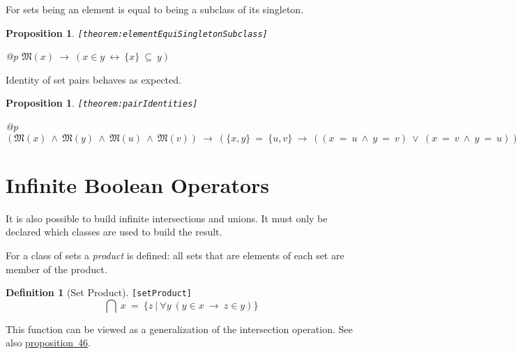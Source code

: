 \documentclass[a4paper,german,10pt,twoside]{book}
\newtheorem{prop}[thm]{Proposition}
\theoremstyle{definition}
\newtheorem{defn}{Definition}
\theoremstyle{remark}
\begin{document}
\par
For sets being an element is equal to being a subclass of its singleton.

\begin{prop}
\label{theorem:elementEquiSingletonSubclass} \hypertarget{theorem:elementEquiSingletonSubclass}{}
{\tt \tiny [\verb]theorem:elementEquiSingletonSubclass]]}
\mbox{}
\begin{longtable}{{@{\extracolsep{\fill}}p{\linewidth}}}
\centering $\mathfrak{M}(x)\ \rightarrow\ (x \in y\ \leftrightarrow\ \{ x \} \ \subseteq \ y)$
\end{longtable}

\end{prop}


\par
Identity of set pairs behaves as expected.

\begin{prop}
\label{theorem:pairIdentities} \hypertarget{theorem:pairIdentities}{}
{\tt \tiny [\verb]theorem:pairIdentities]]}
\mbox{}
\begin{longtable}{{@{\extracolsep{\fill}}p{\linewidth}}}
\centering $(\mathfrak{M}(x)\ \land\ \mathfrak{M}(y)\ \land\ \mathfrak{M}(u)\ \land\ \mathfrak{M}(v))\ \rightarrow\ (\{ x, y \} \ = \ \{ u, v \}\ \rightarrow\ ((x \ = \ u\ \land\ y \ = \ v)\ \lor\ (x \ = \ v\ \land\ y \ = \ u)))$
\end{longtable}

\end{prop}


\section{Infinite Boolean Operators} \label{chapter4_section5} \hypertarget{chapter4_section5}{}
It is also possible to build infinite intersections and unions. It must only be declared which classes
are used to build the result.

\par
For a class of sets a \emph{product} is defined: all sets that are elements of each set
are member of the product.

\begin{defn}[Set Product]
\label{setProduct} \hypertarget{setProduct}{}
{\tt \tiny [\verb]setProduct]]}
$$\bigcap \ x \ = \ \{ z \ | \ \forall y\ (y \in x\ \rightarrow\ z \in y) \} $$
\end{defn}

This function can be viewed as a generalization of the intersection operation.
See also \hyperlink{theorem:setPairSetSumProduct}{proposition~46}.
\end{document}
